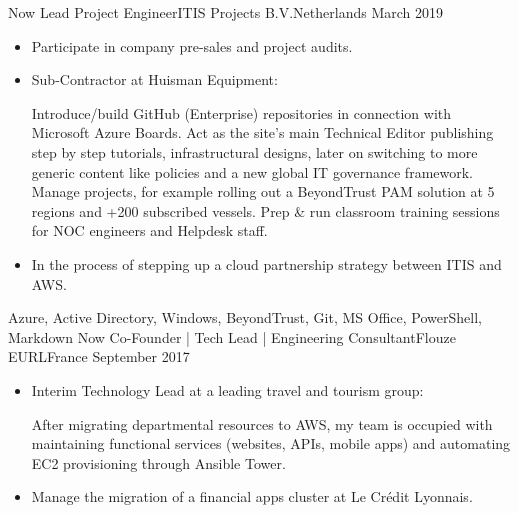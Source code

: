 %
%
%

\begin{experiences}
  \experience
    {Now}           {Lead Project Engineer}{ITIS Projects B.V.}{Netherlands}
    {March 2019}    {
                      \begin{itemize}
                        \item Participate in company pre-sales and project audits.                        
                        \item Sub-Contractor at Huisman Equipment:
                        
                        \linebreak Introduce/build GitHub (Enterprise) repositories in connection with Microsoft Azure Boards.
                        \linebreak Act as the site's main Technical Editor publishing step by step tutorials, infrastructural designs, later on switching to more generic content like policies and a new global IT governance framework.
                        \linebreak Manage projects, for example rolling out a BeyondTrust PAM solution at 5 regions and +200 subscribed vessels.
                        \linebreak Prep \& run classroom training sessions for NOC engineers and Helpdesk staff.
                        
                        \item In the process of stepping up a cloud partnership strategy between ITIS and AWS.           
                      \end{itemize}
                    }
                    {Azure, Active Directory, Windows, BeyondTrust, Git, MS Office, PowerShell, Markdown}
  \emptySeparator
  \experience
    {Now}           {Co-Founder | Tech Lead | Engineering Consultant}{Flouze EURL}{France}
    {September 2017}{
                      \begin{itemize}
                        \item Interim Technology Lead at a leading travel and tourism group: 
                        
                        \linebreak After migrating departmental resources to AWS, my team is occupied with maintaining functional services (websites, APIs, mobile apps) and automating EC2 provisioning through Ansible Tower.                           
                        \item Manage the migration of a financial apps cluster at Le Crédit Lyonnais.                       


\end{itemize}}
\end{experiences}
